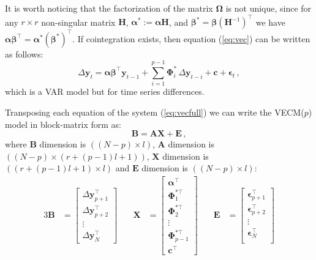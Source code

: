 It is worth noticing that the factorization of the matrix
$\boldsymbol\Omega$ is not unique, since for any $r \times r$
non-singular matrix $\mathbf{H}$, $\boldsymbol{\alpha}^*:=\boldsymbol{\alpha}\mathbf{H}$,
and $\boldsymbol{\beta}^*=\boldsymbol{\beta}(\mathbf{H}^{-1})^\top$ we have
$\boldsymbol{\alpha\beta}^\top=\boldsymbol{\alpha}^*(\boldsymbol{\beta}^*)^\top$.
If cointegration exists, then equation (\ref{eq:vec}) can be written
as follows:
\begin{equation}\label{eq:vecfull}
\Delta\mathbf{y}_t 
= \boldsymbol{\alpha\beta}^\top\mathbf{y}_{t-1} 
  + \sum_{i=1}^{p-1}\boldsymbol{\Phi}_i^*\,\Delta\mathbf{y}_{t-i}
  + \mathbf{c} + \boldsymbol{\epsilon}_t\,,
\end{equation}
\noindent
which is a VAR model but for time series differences.


Transposing each equation of the system (\ref{eq:vecfull}) we can write
the VECM($p$) model in block-matrix form as:
\begin{equation}\label{eq:vareq}
\mathbf{B} = 
\mathbf{A} \mathbf{X} + 
\mathbf{E} \, , 
\end{equation}
%
\noindent where $\mathbf{B}$ dimension is $((N-p)\times l)$, $\mathbf{A}$
dimension is $((N-p)\times(r+(p-1)l +1))$, $\mathbf{X}$ dimension is $((r+(p-1)l
+1)\times l)$ and $\mathbf{E}$ dimension is $((N-p)\times l)$:
%
\begin{alignat}{3}
\mathbf{B}
&= \begin{bmatrix}
   \Delta\mathbf{y}_{p+1}^\top \\
   \Delta\mathbf{y}_{p+2}^\top \\
   \vdots \\
   \Delta\mathbf{y}_N^\top
   \end{bmatrix}
&\quad
\mathbf{X}
&= \begin{bmatrix}
   \boldsymbol{\alpha}^\top \\
   \boldsymbol{\Phi}_1^{*\top} \\
   \boldsymbol{\Phi}_2^{*\top} \\
   \vdots \\
   \boldsymbol{\Phi}_{p-1}^{*\top} \\
   \mathbf{c}^\top
   \end{bmatrix}
&\quad
\mathbf{E}
&= \begin{bmatrix}
   \boldsymbol{\epsilon}_{p+1}^\top \\
   \boldsymbol{\epsilon}_{p+2}^\top \\
   \vdots \\
   \boldsymbol{\epsilon}_N^\top \\
   \end{bmatrix}
\end{alignat}
